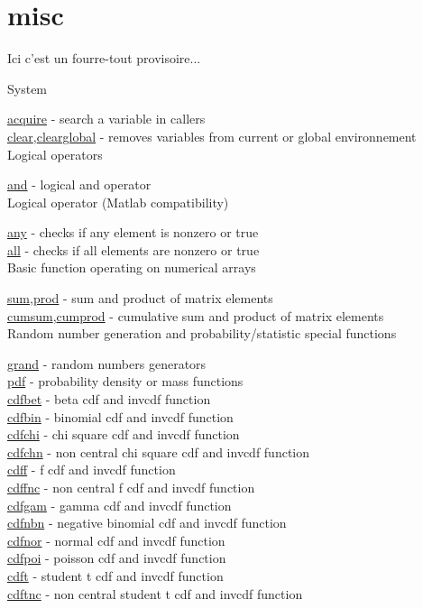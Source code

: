 \chapter*{misc}

Ici c'est un fourre-tout provisoire... 

System

\hyperlink{acquire}{acquire} - search a variable in callers  \\
\hyperlink{clear}{clear},\hyperlink{clearglobal}{clearglobal} -
removes variables from current or global environnement  \\


Logical operators

\hyperlink{and}{and} - logical and operator \\


Logical operator (Matlab compatibility)

\hyperlink{any}{any} - checks if any element is nonzero or true  \\
\hyperlink{all}{all} - checks if all elements are nonzero or true \\

Basic function operating on numerical arrays

\hyperlink{sum}{sum},\hyperlink{prod}{prod} - sum and product of matrix elements \\
\hyperlink{cumsum}{cumsum},\hyperlink{cumprod}{cumprod} - cumulative sum and product of matrix elements \\
 

Random number generation and probability/statistic special functions

\hyperlink{grand}{grand} - random numbers generators \\
\hyperlink{pdf}{pdf} - probability density or mass functions \\
\hyperlink{cdfbet}{cdfbet} - beta cdf and invcdf function \\
\hyperlink{cdfbin}{cdfbin} - binomial cdf and invcdf function \\
\hyperlink{cdfchi}{cdfchi} - chi square cdf and invcdf function \\
\hyperlink{cdfchn}{cdfchn} - non central chi square cdf and invcdf function \\
\hyperlink{cdff}{cdff} - f cdf and invcdf function \\
\hyperlink{cdffnc}{cdffnc} - non central f cdf and invcdf function \\
\hyperlink{cdfgam}{cdfgam} - gamma cdf and invcdf function \\
\hyperlink{cdfnbn}{cdfnbn} - negative binomial cdf and invcdf function \\
\hyperlink{cdfnor}{cdfnor} - normal cdf and invcdf function \\
\hyperlink{cdfpoi}{cdfpoi} - poisson cdf and invcdf function \\
\hyperlink{cdft}{cdft} - student t cdf and invcdf function \\
\hyperlink{cdftnc}{cdftnc} - non central student t cdf and invcdf function \\


